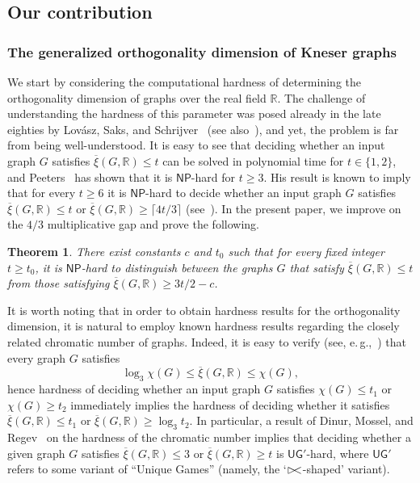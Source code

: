 \documentclass[11pt]{article}
\numberwithin{equation}{section}
\newtheorem{theorem}{Theorem}[section]
\theoremstyle{definition}
\theoremstyle{plain}
\newcommand{\R}{\mathbb R}
\newcommand{\NP}{\mathsf{NP}}
\newcommand{\UG}{\mathsf{UG}}   %
\newcommand{\od}{\overline{\xi}}
\newcommand\fish{{\rhd \hskip -0.5 em <}}
\begin{document}
\subsection{Our contribution}

\subsubsection{The generalized orthogonality dimension of Kneser graphs}

We start by considering the computational hardness of determining the orthogonality dimension of graphs over the real field $\R$.
The challenge of understanding the hardness of this parameter was posed already in the late eighties by Lov\'asz, Saks, and Schrijver~\cite{LovaszSS89} (see also~\cite[Chapter~10]{LovaszBook}), and yet, the problem is far from being well-understood.
It is easy to see that deciding whether an input graph $G$ satisfies $\od(G,\R) \leq t$ can be solved in polynomial
%
%
time  %
for $t \in \{1,2\}$, and Peeters~\cite{Peeters96} has shown that it is $\NP$-hard for $t \geq 3$.
His result is known to imply that for every $t \geq 6$ it is $\NP$-hard to decide whether an input graph $G$ satisfies $\od(G,\R) \leq t$ or $\od(G,\R) \geq \lceil 4t/3 \rceil$ (see~\cite{HavivMFCS19}).
In the %
present paper,  %
we improve on the $4/3$ multiplicative gap and prove the following.
%
%
%
%
%
%
%
%
\begin{theorem}\label{thm:IntroHardness}
There exist constants $c$ and $t_0$ such that for every fixed integer $t \geq t_0$, it is $\NP$-hard to distinguish between the graphs $G$ that satisfy $\od(G,\R) \leq t$ from those satisfying $\od(G,\R) \geq 3t/2-c$.
\end{theorem}
%

It is worth noting that in order to obtain hardness results for the orthogonality dimension,
%
%
it is natural to employ known hardness results regarding the closely related chromatic number of graphs. Indeed, it is easy to verify (see, e.\,g.,~\cite{HavivMFCS19}) that every graph $G$ satisfies
\[\log_3 \chi(G) \leq \od(G,\R) \leq \chi(G),\]
hence hardness of deciding whether an input graph $G$ satisfies $\chi(G) \leq t_1$ or $\chi(G) \geq t_2$ immediately implies the hardness of deciding whether it satisfies $\od(G,\R) \leq t_1$ or $\od(G,\R) \geq \log_3 t_2$. In particular, a result of Dinur, Mossel, and Regev~\cite{DinurMR06} on the hardness of the chromatic number implies that %
%
%
%
deciding whether a given graph $G$ satisfies $\od(G,\R) \leq 3$ or $\od(G,\R) \geq t$
%
%
%
%
%
is $\UG'$-hard, where $\UG'$ refers to some variant of
``Unique Games'' (namely, the `$\fish$-shaped' variant). %
\end{document}
